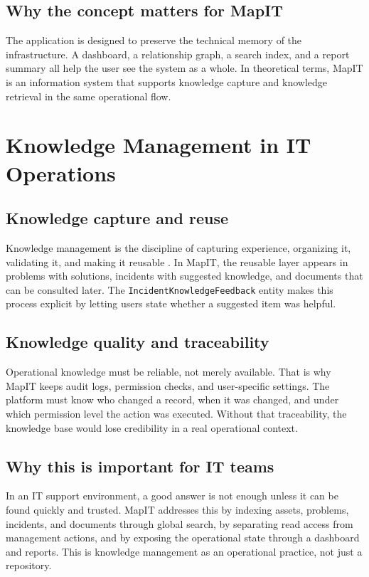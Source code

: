 \subsection{Why the concept matters for MapIT}
The application is designed to preserve the technical memory of the infrastructure. A dashboard, a relationship graph, a search index, and a report summary all help the user see the system as a whole. In theoretical terms, MapIT is an information system that supports knowledge capture and knowledge retrieval in the same operational flow.

\section{Knowledge Management in IT Operations}
\subsection{Knowledge capture and reuse}
Knowledge management is the discipline of capturing experience, organizing it, validating it, and making it reusable \cite{davenport_prusak,nonaka_konno,km}. In MapIT, the reusable layer appears in problems with solutions, incidents with suggested knowledge, and documents that can be consulted later. The \texttt{IncidentKnowledgeFeedback} entity makes this process explicit by letting users state whether a suggested item was helpful.

\subsection{Knowledge quality and traceability}
Operational knowledge must be reliable, not merely available. That is why MapIT keeps audit logs, permission checks, and user-specific settings. The platform must know who changed a record, when it was changed, and under which permission level the action was executed. Without that traceability, the knowledge base would lose credibility in a real operational context.

\subsection{Why this is important for IT teams}
In an IT support environment, a good answer is not enough unless it can be found quickly and trusted. MapIT addresses this by indexing assets, problems, incidents, and documents through global search, by separating read access from management actions, and by exposing the operational state through a dashboard and reports. This is knowledge management as an operational practice, not just a repository.

